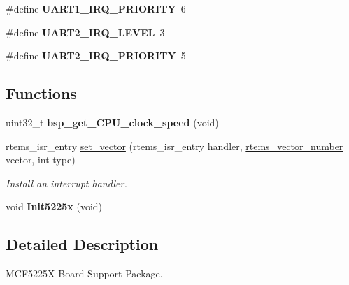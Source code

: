 \begin{DoxyCompactItemize}
\item 
\mbox{\label{group__RTEMSBSPsM68kMCF5225X_gafa24779091dd9f575af1f8482cea5b2a}} 
\#define {\bfseries U\+A\+R\+T1\+\_\+\+I\+R\+Q\+\_\+\+P\+R\+I\+O\+R\+I\+TY}~6
\item 
\mbox{\label{group__RTEMSBSPsM68kMCF5225X_ga4fa66263959fe836ffc8cc89554a22e7}} 
\#define {\bfseries U\+A\+R\+T2\+\_\+\+I\+R\+Q\+\_\+\+L\+E\+V\+EL}~3
\item 
\mbox{\label{group__RTEMSBSPsM68kMCF5225X_gabe7562294780b56d1dd0e8cc91df557e}} 
\#define {\bfseries U\+A\+R\+T2\+\_\+\+I\+R\+Q\+\_\+\+P\+R\+I\+O\+R\+I\+TY}~5
\end{DoxyCompactItemize}
\subsection*{Functions}
\begin{DoxyCompactItemize}
\item 
\mbox{\label{group__RTEMSBSPsM68kMCF5225X_gaf40918e55ef318de160e2e3174ba5562}} 
uint32\+\_\+t {\bfseries bsp\+\_\+get\+\_\+\+C\+P\+U\+\_\+clock\+\_\+speed} (void)
\item 
rtems\+\_\+isr\+\_\+entry \mbox{\hyperlink{group__RTEMSBSPsM68kMCF5225X_gab3388042c56b34c40be81fd5f028d97e}{set\+\_\+vector}} (rtems\+\_\+isr\+\_\+entry handler, \mbox{\hyperlink{group__ClassicINTR_ga3e434c197d99f128e78cae4d9358bd8b}{rtems\+\_\+vector\+\_\+number}} vector, int type)
\begin{DoxyCompactList}\small\item\em Install an interrupt handler. \end{DoxyCompactList}\item 
\mbox{\label{group__RTEMSBSPsM68kMCF5225X_ga7bd5a395b072a892758708ebfb1664a0}} 
void {\bfseries Init5225x} (void)
\end{DoxyCompactItemize}


\subsection{Detailed Description}
M\+C\+F5225X Board Support Package. 



